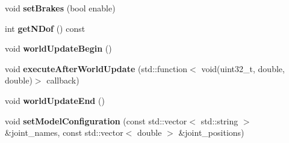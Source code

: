 \begin{DoxyCompactItemize}
void {\bfseries set\+Brakes} (bool enable)
\item 
\mbox{\label{classgazebo_1_1_panda_simulation_a0fac8fcf06af7b21bb7a68f98c494e3c}} 
int {\bfseries get\+N\+Dof} () const
\item 
\mbox{\label{classgazebo_1_1_panda_simulation_aaabec68606f677cfa46df91a17f1d948}} 
void {\bfseries world\+Update\+Begin} ()
\item 
\mbox{\label{classgazebo_1_1_panda_simulation_a16ec7f132866d2abcd0780d56178953e}} 
void {\bfseries execute\+After\+World\+Update} (std\+::function$<$ void(uint32\+\_\+t, double, double)$>$ callback)
\item 
\mbox{\label{classgazebo_1_1_panda_simulation_a45a8b9835469071f56b7943b80b05909}} 
void {\bfseries world\+Update\+End} ()
\item 
\mbox{\label{classgazebo_1_1_panda_simulation_a2db6dca2d21fa4a60f150ae05b3732e6}} 
void {\bfseries set\+Model\+Configuration} (const std\+::vector$<$ std\+::string $>$ \&joint\+\_\+names, const std\+::vector$<$ double $>$ \&joint\+\_\+positions)
\end{DoxyCompactItemize}
